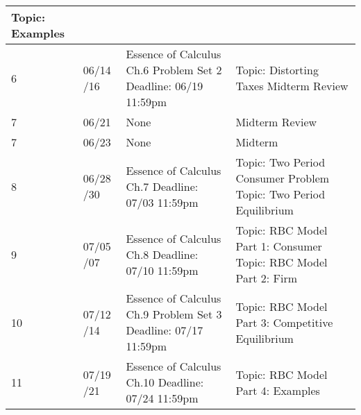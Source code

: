 \documentclass[12pt]{article}
\begin{document}
\begin{tabular}{|p{\bb}|p{\qq}|p{\rr}|p{\pp}|}
        \newline
        Topic: Examples
    \\
    \hline
        6
        &
        06/14
        \newline
        06/16
        &
        Essence of Calculus Ch.6
        \newline
        Problem Set 2
        \newline
        Deadline: 06/19 11:59pm
        &
        Topic: Distorting Taxes
        \newline
        Midterm Review
    \\
    \hline
        7
        &
        06/21
        &
        None
        &
        Midterm Review
    \\
    \hline
        7
        &
        06/23
        &
        None
        &
        Midterm
    \\
    \hline
        8
        &
        06/28
        \newline
        06/30
        &
        Essence of Calculus Ch.7
        \newline
        Deadline: 07/03 11:59pm
        &
        Topic: Two Period Consumer Problem
        \newline
        Topic: Two Period Equilibrium
    \\
    \hline
        9
        &
        07/05
        \newline
        07/07
        &
        Essence of Calculus Ch.8
        \newline
        Deadline: 07/10 11:59pm
        &
        Topic: RBC Model Part 1: Consumer
        \newline
        Topic: RBC Model Part 2: Firm
    \\
    \hline
        10
        &
        07/12
        \newline
        07/14
        &
        Essence of Calculus Ch.9
        \newline
        Problem Set 3
        \newline
        Deadline: 07/17 11:59pm
        &
        Topic: RBC Model Part 3: Competitive Equilibrium
    \\
    \hline
        11
        &
        07/19
        \newline
        07/21
        &
        Essence of Calculus Ch.10
        \newline
        Deadline: 07/24 11:59pm
        &
        Topic: RBC Model Part 4: Examples
    \\
    \hline

\end{tabular}
\end{document}
